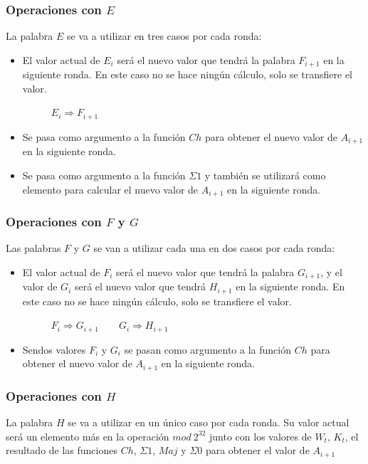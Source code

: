 \documentclass{article}
\begin{document}
        \subsubsection{Operaciones con $E$}
            La palabra $E$ se va a utilizar en tres casos por cada ronda:
            \begin{itemize}
                \item El valor actual de $E_{i}$ será el nuevo valor que tendrá la palabra $F_{i+1}$ en la siguiente ronda. En este caso no se hace ningún cálculo, solo se transfiere el valor.
                \begin{figure}[H]
                \centering
                    $E_{i} \Rightarrow F_{i+1}$
                \end{figure}
                \item Se pasa como argumento a la función $Ch$ para obtener el nuevo valor de $A_{i+1}$ en la siguiente ronda.
                \item Se pasa como argumento a la función $\Sigma1$ y también se utilizará como elemento para calcular el nuevo valor de $A_{i+1}$ en la siguiente ronda.
            \end{itemize}
        
        \subsubsection{Operaciones con $F$ y $G$}
            Las palabras $F$ y $G$ se van a utilizar cada una en dos casos por cada ronda:
            \begin{itemize}
                \item El valor actual de $F_{i}$ será el nuevo valor que tendrá la palabra $G_{i+1}$, y el valor de $G_{i}$ será el nuevo valor que tendrá $H_{i+1}$ en la siguiente ronda. En este caso no se hace ningún cálculo, solo se transfiere el valor.
                \begin{figure}[H]
                \centering
                    $F_{i} \Rightarrow G_{i+1} \qquad G_{i} \Rightarrow H_{i+1}$
                \end{figure}
                \item Sendos valores $F_{i}$ y $G_{i}$ se pasan como argumento a la función $Ch$ para obtener el nuevo valor de $A_{i+1}$ en la siguiente ronda.
            \end{itemize}
        
        \subsubsection{Operaciones con $H$}
            La palabra $H$ se va a utilizar en un único caso por cada ronda. Su valor actual será un elemento más en la operación $mod \ 2^{32}$ junto con los valores de $W_{t}$, $K_{t}$, el resultado de las funciones $Ch$, $\Sigma1$, $Maj$ y $\Sigma0$ para obtener el valor de $A_{i+1}$
        
\end{document}
